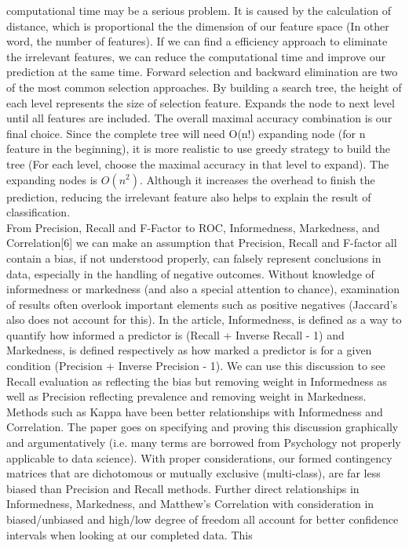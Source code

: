 \documentclass[acmtog, authorversion]{acmart}
\begin{document}
computational time may be a serious problem. It is caused by the calculation of distance, which is proportional the the dimension of our feature space 
(In other word, the number of features). If we can find a efficiency approach to eliminate the irrelevant features, we can reduce the computational time 
and improve our prediction at the same time. 
Forward selection and backward elimination are two of the most common selection approaches. By building a search tree, the height of each level represents 
the size of selection feature. Expands the node to next level until all features are included. The overall maximal accuracy combination is our final 
choice. Since the complete tree will need O(n!) expanding node (for n feature in the beginning), it is more realistic to use greedy strategy to build the 
tree (For each level, choose the maximal accuracy in that level to expand). The expanding nodes is $O(n^2)$. Although it increases the overhead to finish 
the prediction, reducing the irrelevant feature also helps to explain the result of classification.\\ 
From Precision, Recall and F-Factor to ROC, Informedness, Markedness, and Correlation[6] we can make an assumption that Precision, 
Recall and F-factor all contain a bias, if not understood properly, can falsely represent conclusions in data, especially in the handling of negative 
outcomes. Without knowledge of informedness or markedness (and also a special attention to chance), examination of results often overlook important 
elements such as positive negatives (Jaccard’s also does not account for this). In the article, Informedness, is defined as a way to quantify how 
informed a predictor is (Recall + Inverse Recall - 1) and Markedness, is defined respectively as how marked a predictor is for a given condition 
(Precision + Inverse Precision - 1). We can use this discussion to see Recall evaluation as reflecting the bias but removing weight in Informedness as 
well as Precision reflecting prevalence and removing weight in Markedness. Methods such as Kappa have been better relationships with Informedness and 
Correlation. The paper goes on specifying and proving this discussion graphically and argumentatively (i.e. many terms are borrowed from Psychology not 
properly applicable to data science). With proper considerations, our formed contingency matrices that are dichotomous or mutually exclusive 
(multi-class), are far less biased than Precision and Recall methods. Further direct relationships in Informedness, Markedness, and Matthew’s Correlation 
with consideration in biased/unbiased and high/low degree of freedom all account for better confidence intervals when looking at our completed data. This 
\end{document}
